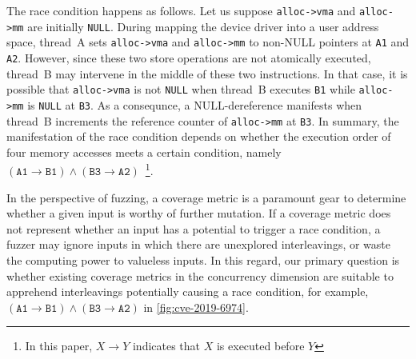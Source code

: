 The race condition happens as follows. Let us suppose
\texttt{alloc->vma} and \texttt{alloc->mm} are initially
\texttt{NULL}.
%
During mapping the device driver into a user address space, thread~A
sets \texttt{alloc->vma} and \texttt{alloc->mm} to non-NULL pointers
at \texttt{A1} and \texttt{A2}.
%
However, since these two store operations are not atomically executed,
thread~B may intervene in the middle of these two instructions.
%
In that case, it is possible that \texttt{alloc->vma} is not
\texttt{NULL} when thread~B executes \texttt{B1} while
\texttt{alloc->mm} is \texttt{NULL} at \texttt{B3}.
%
As a consequnce, a NULL-dereference manifests when thread~B increments
the reference counter of \texttt{alloc->mm} at \texttt{B3}.
%
In summary, the manifestation of the race condition depends on whether
the execution order of four memory accesses meets a certain condition,
namely
$(\texttt{A1} \rightarrow \texttt{B1}) \wedge (\texttt{B3} \rightarrow
\texttt{A2})$~\footnote{In this paper, $X \rightarrow Y$ indicates that $X$
  is executed before $Y$}.






%
In the perspective of fuzzing, a coverage metric is a paramount gear
to determine whether a given input is worthy of further mutation.
%
If a coverage metric does not represent whether an input has a
potential to trigger a race condition, a fuzzer may ignore inputs in
which there are unexplored interleavings, or waste the computing power
to valueless inputs.
%
In this regard, our primary question is whether existing coverage
metrics in the concurrency dimension are suitable to apprehend
interleavings potentially causing a race condition, for example,
$(\texttt{A1} \rightarrow \texttt{B1}) \wedge (\texttt{B3} \rightarrow
\texttt{A2})$ in \autoref{fig:cve-2019-6974}.



